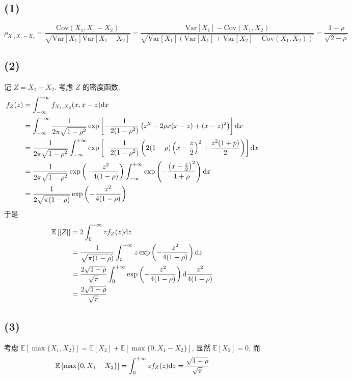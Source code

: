\documentclass[8pt]{article}
\theoremstyle{compact}
\def\E#1{\mathbb{E}\left[{#1}\right]}
\def\Var#1{\text{Var}\left[{#1}\right]}
\def\Cov#1{\text{Cov}\left({#1}\right)}
\begin{document}
\subsection*{(1)}
\begin{equation*}
	\rho_{X_1, X_1 - X_2} = \frac{\Cov{X_1, X_1 - X_2}}{\sqrt{\Var{X_1}\Var{X_1 - X_2}}} = \frac{\Var{X_1} - \Cov{X_1, X_2}}{\sqrt{\Var{X_1} (\Var{X_1} + \Var{X_2} - \Cov{X_1, X_2}) }} = \frac{1 - \rho}{\sqrt{2 - \rho}}
\end{equation*}
\subsection*{(2)}
记 $Z = X_1 - X_2$. 考虑 $Z$ 的密度函数.
\begin{equation*}
	\begin{split}
		f_Z(z) &= \int_{-\infty}^{+\infty}f_{X_1, X_2}(x, x - z)\text dx\\
		&= \int_{-\infty}^{+\infty}\frac{1}{2\pi\sqrt{1-\rho^2}}\exp\left[-\frac{1}{2(1-\rho^2)}\left(x^2 - 2\rho x(x-z) + (x-z)^2\right)\right] \text dx\\
		&= \frac{1}{2\pi\sqrt{1-\rho^2}}\int_{-\infty}^{+\infty}\exp\left[-\frac{1}{2(1-\rho^2)}\left(2(1-\rho)\left(x - \frac z2\right)^2 + \frac{z^2(1+p)}{2}\right)\right] \text dx\\
		&= \frac{1}{2\pi\sqrt{1-\rho^2}}\exp\left(-\frac{z^2}{4(1-\rho)}\right)\int_{-\infty}^{+\infty}\exp\left(-\frac{\left(x - \frac z2\right)^2}{1+\rho}\right)\text dx\\
		&= \frac{1}{2\sqrt{\pi(1 - \rho)}}\exp\left(-\frac{z^2}{4(1-\rho)}\right)
	\end{split}
\end{equation*}
于是
\begin{equation*}
	\begin{split}
		\E{|Z|} &= 2\int_{0}^{+\infty} zf_Z(z)\text dz\\
		&= \frac{1}{\sqrt{\pi(1 - \rho)}}\int_{0}^{+\infty} z\exp\left(-\frac{z^2}{4(1-\rho)}\right)\text dz\\
		&= \frac{2\sqrt{1-\rho}}{\sqrt{\pi}}\int_0^{+\infty}\exp\left(-\frac{z^2}{4(1-\rho)}\right)\text d\frac{z^2}{4(1-\rho)}\\
		&= \frac{2\sqrt{1-\rho}}{\sqrt \pi}
	\end{split}
\end{equation*}

\subsection*{(3)}
考虑 $\E{\max\{X_1, X_2\}} = \E{X_2} + \E{\max\{0, X_1 - X_2\}}$, 显然 $\E{X_2} = 0$, 而\begin{equation*}
	\E{\max\{0, X_1 - X_2\}} = \int_{0}^{+\infty}zf_Z(z)\text dz = \frac{\sqrt{1 - \rho}}{\sqrt{\pi}}
\end{equation*}
\end{document}
